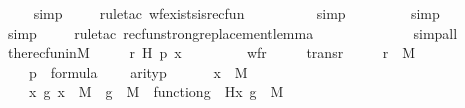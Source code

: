 \begin{isabellebody}
\ \ \ \isamarkupfalse%
\ simp\ \isanewline
\ \ \isamarkupfalse%
\ {\isacharparenleft}{\kern0pt}rule{\isacharunderscore}{\kern0pt}tac\ wf{\isacharunderscore}{\kern0pt}exists{\isacharunderscore}{\kern0pt}is{\isacharunderscore}{\kern0pt}recfun{\isacharparenright}{\kern0pt}\ \isanewline
\ \ \ \ \ \ \ \isamarkupfalse%
\ simp\ \isanewline
\ \ \ \ \ \ \isamarkupfalse%
\ simp\ \isanewline
\ \ \ \ \ \isamarkupfalse%
\ simp\isanewline
\ \ \ \ \isamarkupfalse%
{\isacharparenleft}{\kern0pt}rule{\isacharunderscore}{\kern0pt}tac\ recfun{\isacharunderscore}{\kern0pt}strong{\isacharunderscore}{\kern0pt}replacement{\isacharunderscore}{\kern0pt}lemma{\isacharparenright}{\kern0pt}\ \isanewline
\ \ \ \ \ \ \ \ \ \ \ \isamarkupfalse%
\ simp{\isacharunderscore}{\kern0pt}all\ \isanewline
\ \ \isamarkupfalse%
%
\endisatagproof
{\isafoldproof}%
%
\isadelimproof
\ \isanewline
%
\endisadelimproof
\isanewline
{}\isamarkupfalse%
\ the{\isacharunderscore}{\kern0pt}recfun{\isacharunderscore}{\kern0pt}in{\isacharunderscore}{\kern0pt}M\ {\isacharcolon}{\kern0pt}\ \isanewline
\ \ \ r\ H\ p\ x\ \isanewline
\ \ \ \isanewline
\ \ \ \ {\isachardoublequoteopen}wf{\isacharparenleft}{\kern0pt}r{\isacharparenright}{\kern0pt}{\isachardoublequoteclose}\ \isanewline
\ \ \ \ {\isachardoublequoteopen}trans{\isacharparenleft}{\kern0pt}r{\isacharparenright}{\kern0pt}{\isachardoublequoteclose}\ \isanewline
\ \ \ \ {\isachardoublequoteopen}r\ {\isasymin}\ M{\isachardoublequoteclose}\ \isanewline
\ \ \ \ {\isachardoublequoteopen}p\ {\isasymin}\ formula{\isachardoublequoteclose}\isanewline
\ \ \ \ {\isachardoublequoteopen}arity{\isacharparenleft}{\kern0pt}p{\isacharparenright}{\kern0pt}\ {\isasymle}\ {}{\isachardoublequoteclose}\isanewline
\ \ \ \ {\isachardoublequoteopen}x\ {\isasymin}\ M{\isachardoublequoteclose}\ \isanewline
\ \ \ \ {\isachardoublequoteopen}{\isacharparenleft}{\kern0pt}{\isasymAnd}x\ g{\isachardot}{\kern0pt}\ x\ {\isasymin}\ M\ {\isasymLongrightarrow}\ g\ {\isasymin}\ M\ {\isasymLongrightarrow}\ function{\isacharparenleft}{\kern0pt}g{\isacharparenright}{\kern0pt}\ {\isasymLongrightarrow}\ H{\isacharparenleft}{\kern0pt}x{\isacharcomma}{\kern0pt}\ g{\isacharparenright}{\kern0pt}\ {\isasymin}\ M{\isacharparenright}{\kern0pt}{\isachardoublequoteclose}\ \isanewline

\end{isabellebody}
